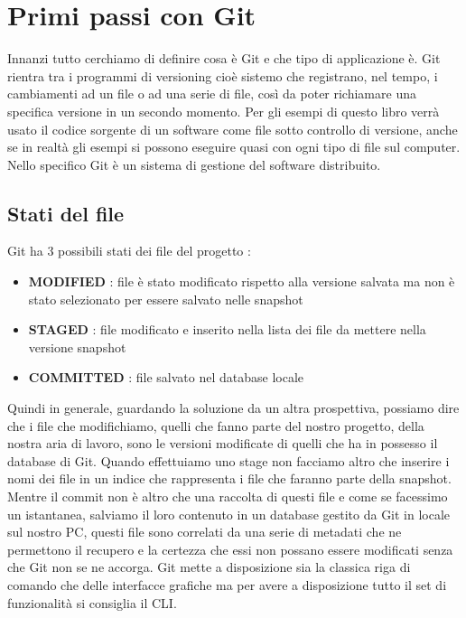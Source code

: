 \chapter{Primi passi con Git}

Innanzi tutto cerchiamo di definire cosa è Git e che tipo di applicazione è.
Git rientra tra i programmi di versioning cioè sistemo che registrano, nel tempo, i cambiamenti ad un file o ad una serie di file, così da poter richiamare una specifica versione in un secondo momento. Per gli esempi di questo libro verrà usato il codice sorgente di un software come file sotto controllo di versione, anche se in realtà gli esempi si possono eseguire quasi con ogni tipo di file sul computer.
Nello specifico Git è un sistema di gestione del software distribuito.

\section{Stati del file}

Git ha 3 possibili stati dei file del progetto :
\begin{itemize}
	\item \textbf{MODIFIED} : file è stato modificato rispetto alla versione salvata ma non è stato selezionato per essere salvato nelle snapshot
	
	\item \textbf{STAGED} : file modificato e inserito nella lista dei file da mettere nella versione snapshot
	
	\item \textbf{COMMITTED} : file salvato nel database locale
\end{itemize}
Quindi in generale, guardando la soluzione da un altra prospettiva, possiamo dire che i file che modifichiamo, quelli che fanno parte del nostro progetto, della nostra aria di lavoro, sono le versioni modificate di quelli che ha in possesso il database di Git. Quando effettuiamo uno stage non facciamo altro che inserire i nomi dei file in un indice che rappresenta i file che faranno parte della snapshot. Mentre il commit non è altro che una raccolta di questi file e come se facessimo un istantanea, salviamo il loro contenuto in un database gestito da Git in locale sul nostro PC, questi file sono correlati da una serie di metadati che ne permettono il recupero e la certezza che essi non possano essere modificati senza che Git non se ne accorga.
Git mette a disposizione sia la classica riga di comando che delle interfacce grafiche ma per avere a disposizione tutto il set di funzionalità si consiglia il CLI.

